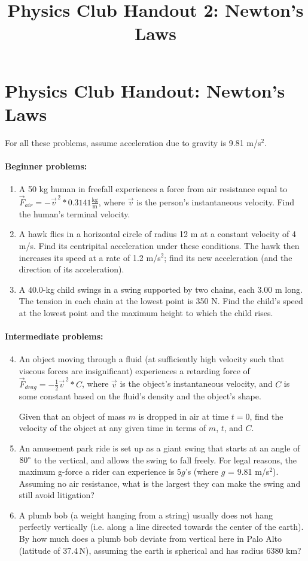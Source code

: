 \documentclass[12pt,letterpaper]{article}
\title{Physics Club Handout 2: Newton's Laws}
\begin{document}
\section{Physics Club Handout: Newton's Laws}
For all these problems, assume acceleration due to gravity is 9.81 m\slash s$^2$.

\paragraph{Beginner problems:}
\begin{enumerate}
\item
A 50 kg human in freefall experiences a force from air resistance equal to $\vec{F}_{air} = -\vec{v}^{\,2}*0.3141\frac{\text{kg}}{\text{m}}$, where $\vec{v}$ is the person's instantaneous velocity. Find the human's terminal velocity.

\item
A hawk flies in a horizontal circle of radius 12 m at a constant velocity of 4 m\slash s. Find its centripital acceleration under these conditions.
The hawk then increases its speed at a rate of 1.2 m\slash s$^2$; find its new acceleration (and the direction of its acceleration).

\item
A 40.0-kg child swings in a swing supported by two chains, each 3.00 m long. The tension in each chain at the lowest point is 350 N. Find the child's speed at the lowest point and the maximum height to which the child rises.
\end{enumerate}

\paragraph{Intermediate problems:}
\begin{enumerate}
\setcounter{enumi}{3}
\item
An object moving through a fluid (at sufficiently high velocity such that viscous forces are insignificant) experiences a retarding force of $\vec{F}_{drag} = -\frac{1}{2}\vec{v}^{\,2}*C$, where $\vec{v}$ is the object's instantaneous velocity, and $C$ is some constant based on the fluid's density and the object's shape.

Given that an object of mass $m$ is dropped in air at time $t = 0$, find the velocity of the object at any given time in terms of $m$, $t$, and $C$.

\item
An amusement park ride is set up as a giant swing that starts at an angle of $80\degree$ to the vertical, and allows the swing to fall freely. For legal reasons, the maximum g-force a rider can experience is $5g$'s (where $g$ = 9.81 m\slash s$^2$). Assuming no air resistance, what is the largest they can make the swing and still avoid litigation?

\item
A plumb bob (a weight hanging from a string) usually does not hang perfectly vertically (i.e. along a line directed towards the center of the earth). By how much does a plumb bob deviate from vertical here in Palo Alto (latitude of 37.4\degree\,N), assuming the earth is spherical and has radius 6380 km?
\end{enumerate}
\end{document}
